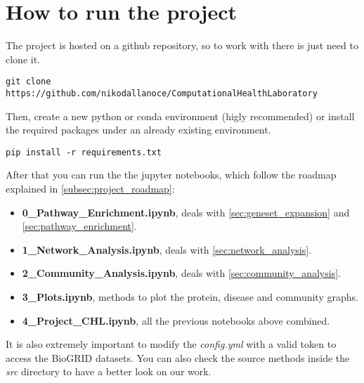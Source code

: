 \appendix
\section{How to run the project}\label{sec:run_project}
The project is hosted on a github repository, so to work with there is just need to clone it.
\begin{verbatim}
git clone https://github.com/nikodallanoce/ComputationalHealthLaboratory
\end{verbatim}
Then, create a new python or conda environment (higly recommended) or install the required packages under an already existing environment.
\begin{verbatim}
pip install -r requirements.txt
\end{verbatim}
After that you can run the the jupyter notebooks, which follow the roadmap explained in \autoref{subsec:project_roadmap}:
\begin{itemize}
    \item \textbf{0\_Pathway\_Enrichment.ipynb}, deals with \autoref{sec:geneset_expansion} and \autoref{sec:pathway_enrichment}.
    \item \textbf{1\_Network\_Analysis.ipynb}, deals with \autoref{sec:network_analysis}.
    \item \textbf{2\_Community\_Analysis.ipynb}, deals with \autoref{sec:community_analysis}.
    \item \textbf{3\_Plots.ipynb}, methods to plot the protein, disease and community graphs.
    \item \textbf{4\_Project\_CHL.ipynb}, all the previous notebooks above combined.
\end{itemize}
It is also extremely important to modify the \textit{config.yml} with a valid token to access the BioGRID \cite{biogrid} datasets. You can also check the source methods inside the \textit{src} directory to have a better look on our work.
